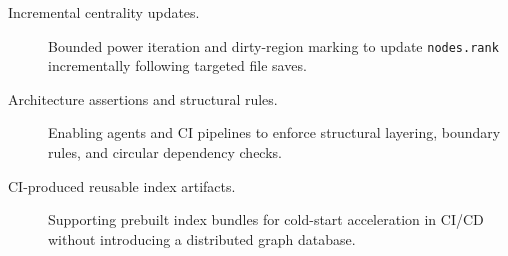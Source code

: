 \begin{description}
  \item[Incremental centrality updates.] Bounded power iteration and dirty-region marking to
        update \texttt{nodes.rank} incrementally following targeted file saves.
  \item[Architecture assertions and structural rules.] Enabling agents and CI pipelines to
        enforce structural layering, boundary rules, and circular dependency checks.
  \item[CI-produced reusable index artifacts.] Supporting prebuilt index bundles for cold-start
        acceleration in CI/CD without introducing a distributed graph database.
\end{description}
